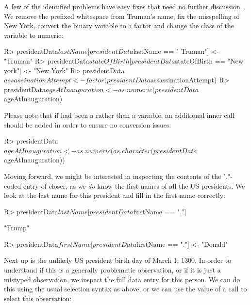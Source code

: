 \documentclass[article,shortnames]{jss}
\begin{document}
A few of the identified problems have easy fixes that need no further discussion. We remove the prefixed whitespace from Truman's name, fix the misspelling of New York, convert the binary variable  to a factor and change the class of the  variable to numeric:

\begin{Schunk}
\begin{Sinput}
R> presidentData$lastName[presidentData$lastName == " Truman"] <- "Truman"
R> presidentData$stateOfBirth[presidentData$stateOfBirth == "New york"] <- "New York"
R> presidentData$assassinationAttempt <- factor(presidentData$assassinationAttempt)
R> presidentData$ageAtInauguration <- as.numeric(presidentData$ageAtInauguration)
\end{Sinput}
\end{Schunk}

Please note that if  had been a  rather than a  variable, an additional inner call should be added in order to ensure no conversion issues:

\begin{Schunk}
\begin{Sinput}
R> presidentData$ageAtInauguration <- as.numeric(as.character(presidentData$ageAtInauguration))
\end{Sinput}
\end{Schunk}

Moving forward, we might be interested in inspecting the contents of the "."-coded entry of  closer, as we \textit{do} know the first names of all the US presidents. We look at the last name for this president and fill in the first name correctly:

\begin{Schunk}
\begin{Sinput}
R> presidentData$lastName[presidentData$firstName == "."]
\end{Sinput}
\begin{Soutput}
[1] "Trump"
\end{Soutput}
\end{Schunk}

\begin{Schunk}
\begin{Sinput}
R> presidentData$firstName[presidentData$firstName == "."] <- "Donald"
\end{Sinput}
\end{Schunk}

Next up is the unlikely US president birth day of March 1, 1300. In order to understand if this is a generally problematic observation, or if it is just a mistyped observation, we inspect the full data entry for this person. We can do this using the usual  selection syntax as above, or we can use the value of a  call to select this observation:
\end{document}
